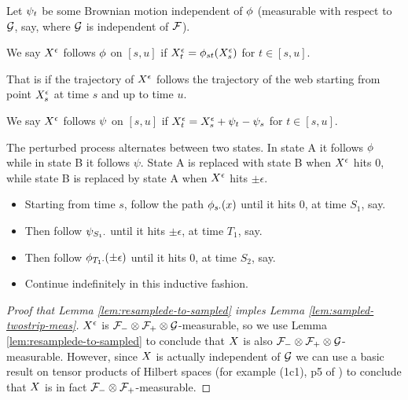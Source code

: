 {{\begin{definition}
  \newcommand{\bmweb}{\psi}

  Let $\psi_{t}$ be
  some Brownian motion independent of $\phi$ (measurable with
  respect to $\mathcal{G}$, say, where $\mathcal{G}$ is independent of
  $\mathcal{F}$).

  We say $X^{\epsilon}$ follows $\phi$ on $[s,u]$ if
  $X^{\epsilon}_t = \phi_{{s}{t}}(X^{\epsilon}_s)$ for $t \in [s,u]$.

  That is if the trajectory of $X^{\epsilon}$ follows the trajectory of
  the web starting from point $X^{\epsilon}_s$ at time $s$ and up to time $u$.

  We say $X^{\epsilon}$ follows $\psi$ on $[s,u]$ if
  $X^{\epsilon}_t = X^{\epsilon}_s + \psi_{t} - \psi_{s}$ for $t \in [s,u]$.

  The perturbed process alternates between two states.  In state A it follows 
  $\phi$ while in state B it follows $\bmweb$. State A is replaced with state B 
  when $X^{\epsilon}$ hits $0$, while state B is replaced by state A when 
  $X^{\epsilon}$ hits $\pm \epsilon$. 

  \begin{itemize}
  \item Starting from time $s$, follow the path $\phi_{{s}{\cdot}}(x)$
    until it hits $0$, at time $S_1$, say.
  \item Then follow $\psi_{{S_1}{\cdot}}$ until it hits $\pm \epsilon$, at
    time $T_1$, say.
  \item Then follow $\phi_{{T_1}{\cdot}}(\pm \epsilon)$ until it hits $0$, at
    time $S_2$, say.
  \item Continue indefinitely in this inductive fashion.
  \end{itemize}
\end{definition}
}

\begin{lemma}
  \label{lem:resamplede-to-sampled}
  \statementoflemresampledetosampled
\end{lemma}

\begin{proof}[Proof that Lemma \ref{lem:resamplede-to-sampled}
    imples Lemma \ref{lem:sampled-twostrip-meas}]
  $X^{\epsilon}$ is $\mathcal{F}_{-} \otimes \mathcal{F}_{+} \otimes \mathcal{G}$-measurable, so we use Lemma
  \ref{lem:resamplede-to-sampled} to conclude that $X$ is also
  $\mathcal{F}_{-} \otimes \mathcal{F}_{+} \otimes \mathcal{G}$-measurable.  However, since $X$ is
  actually independent of $\mathcal{G}$ we can use a basic result on
  tensor products of Hilbert spaces (for example (1c1), p5 of
  \cite{tsirelson-completion}) to conclude that $X$ is
  in fact $\mathcal{F}_{-} \otimes \mathcal{F}_{+}$-measurable.
\end{proof}
}
